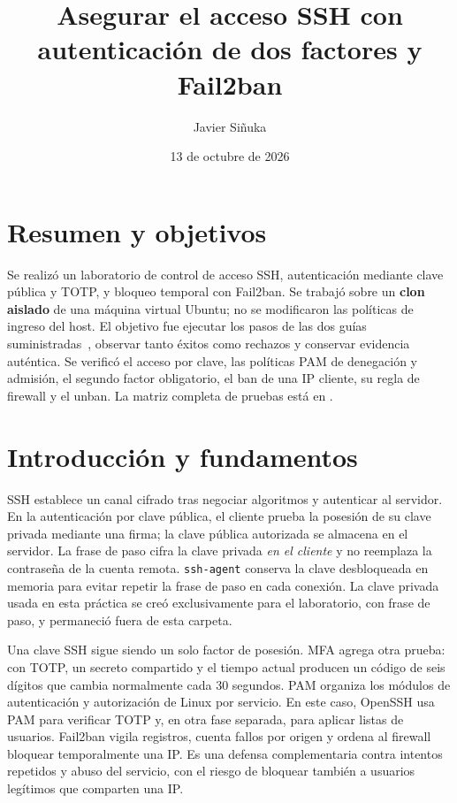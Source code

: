 \documentclass[11pt,a4paper]{article}
\title{Asegurar el acceso SSH con autenticación de dos factores y Fail2ban}
\author{Javier Siñuka}
\date{13 de octubre de 2026}
\begin{document}
\maketitle

\section{Resumen y objetivos}
Se realizó un laboratorio de control de acceso SSH, autenticación mediante
clave pública y TOTP, y bloqueo temporal con Fail2ban. Se trabajó sobre un
\textbf{clon aislado} de una máquina virtual Ubuntu; no se modificaron las
políticas de ingreso del host. El objetivo fue ejecutar los pasos de las dos
guías suministradas~\cite{guia-ssh,guia-mfa}, observar tanto éxitos como
rechazos y conservar evidencia auténtica. Se verificó el acceso por clave,
las políticas PAM de denegación y admisión, el segundo factor obligatorio, el
ban de una IP cliente, su regla de firewall y el unban. La matriz completa de
pruebas está en .

\section{Introducción y fundamentos}
SSH establece un canal cifrado tras negociar algoritmos y autenticar al
servidor. En la autenticación por clave pública, el cliente prueba la posesión
de su clave privada mediante una firma; la clave pública autorizada se almacena
en el servidor. La frase de paso cifra la clave privada \emph{en el cliente} y
no reemplaza la contraseña de la cuenta remota. \texttt{ssh-agent} conserva
la clave desbloqueada en memoria para evitar repetir la frase de paso en cada
conexión. La clave privada usada en esta práctica se creó exclusivamente para
el laboratorio, con frase de paso, y permaneció fuera de esta carpeta.

Una clave SSH sigue siendo un solo factor de posesión. MFA agrega otra prueba:
con TOTP, un secreto compartido y el tiempo actual producen un código de seis
dígitos que cambia normalmente cada 30 segundos. PAM organiza los módulos de
autenticación y autorización de Linux por servicio. En este caso, OpenSSH usa
PAM para verificar TOTP y, en otra fase separada, para aplicar listas de
usuarios. Fail2ban vigila registros, cuenta fallos por origen y ordena al
firewall bloquear temporalmente una IP. Es una defensa complementaria contra
intentos repetidos y abuso del servicio, con el riesgo de bloquear también a
usuarios legítimos que comparten una IP.
\end{document}
